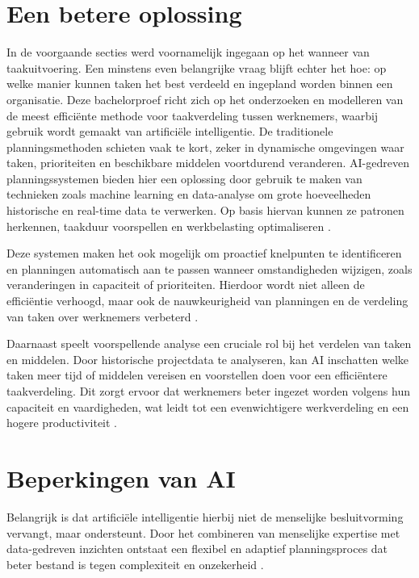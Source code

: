 \section{Een betere oplossing}
\label{ch:een-betere-oplossing}
\vspace{1em} In de voorgaande secties werd voornamelijk ingegaan op het wanneer van taakuitvoering. Een minstens even belangrijke vraag blijft echter het hoe: op welke manier kunnen taken het best verdeeld en ingepland worden binnen een organisatie. Deze bachelorproef richt zich op het onderzoeken en modelleren van de meest efficiënte methode voor taakverdeling tussen werknemers, waarbij gebruik wordt gemaakt van artificiële intelligentie.
De traditionele planningsmethoden schieten vaak te kort, zeker in dynamische omgevingen waar taken, prioriteiten en beschikbare middelen voortdurend veranderen. AI-gedreven planningssystemen bieden hier een oplossing door gebruik te maken van technieken zoals machine learning en data-analyse om grote hoeveelheden historische en real-time data te verwerken. Op basis hiervan kunnen ze patronen herkennen, taakduur voorspellen en werkbelasting optimaliseren \autocite{Alan}.

Deze systemen maken het ook mogelijk om proactief knelpunten te identificeren en planningen automatisch aan te passen wanneer omstandigheden wijzigen, zoals veranderingen in capaciteit of prioriteiten. Hierdoor wordt niet alleen de efficiëntie verhoogd, maar ook de nauwkeurigheid van planningen en de verdeling van taken over werknemers verbeterd \autocite{Alan}. 

Daarnaast speelt voorspellende analyse een cruciale rol bij het verdelen van taken en middelen. Door historische projectdata te analyseren, kan AI inschatten welke taken meer tijd of middelen vereisen en voorstellen doen voor een efficiëntere taakverdeling. Dit zorgt ervoor dat werknemers beter ingezet worden volgens hun capaciteit en vaardigheden, wat leidt tot een evenwichtigere werkverdeling en een hogere productiviteit \autocite{Somanathan2023}.

\section{Beperkingen van AI}
\label{ch:beperkingen-van-ai}
\vspace{1em}Belangrijk is dat artificiële intelligentie hierbij niet de menselijke besluitvorming vervangt, maar ondersteunt. Door het combineren van menselijke expertise met data-gedreven inzichten ontstaat een flexibel en adaptief planningsproces dat beter bestand is tegen complexiteit en onzekerheid \autocite{Alan}.

